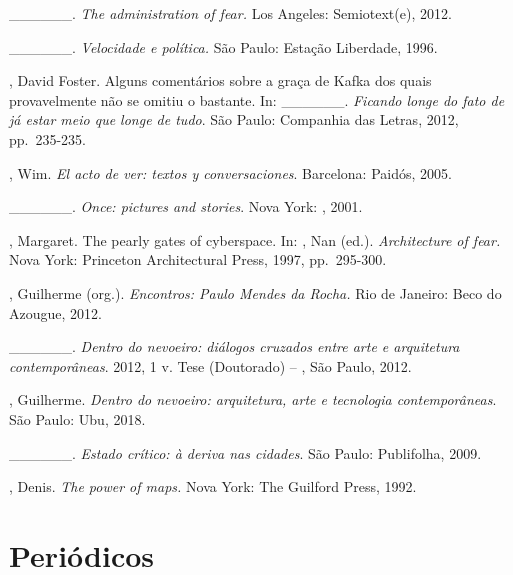 \begin{Parskip}
\_\_\_\_\_\_. \emph{The administration of fear.} Los Angeles: Semiotext(e), 2012.

\_\_\_\_\_\_. \emph{Velocidade e política.} São Paulo: Estação
Liberdade, 1996.

, David Foster. Alguns comentários sobre a graça de Kafka dos
quais provavelmente não se omitiu o bastante. In: \_\_\_\_\_\_.
\emph{Ficando longe do fato de já estar meio que longe de tudo}. São
Paulo: Companhia das Letras, 2012, pp.~235-235.

, Wim. \emph{El acto de ver: textos y conversaciones}.
Barcelona: Paidós, 2005.

\_\_\_\_\_\_. \emph{Once: pictures and stories}. Nova York:
, 2001.

, Margaret. The pearly gates of cyberspace. In: , Nan
(ed.). \emph{Architecture of fear.} Nova York: Princeton Architectural
Press, 1997, pp.~295-300.

, Guilherme (org.). \emph{Encontros: Paulo Mendes da Rocha.} Rio de
Janeiro: Beco do Azougue, 2012.

\_\_\_\_\_\_. \emph{Dentro do nevoeiro: diálogos cruzados entre
arte e arquitetura contemporâneas}. 2012, 1 v. Tese (Doutorado) -- ,
São Paulo, 2012.

, Guilherme. \emph{Dentro do nevoeiro: arquitetura, arte e
tecnologia contemporâneas}. São Paulo: Ubu, 2018.

\_\_\_\_\_\_. \emph{Estado crítico: à deriva nas cidades}. São
Paulo: Publifolha, 2009.

, Denis. \emph{The power of maps.} Nova York: The Guilford Press,
1992.
\end{Parskip}

\section{Periódicos}

